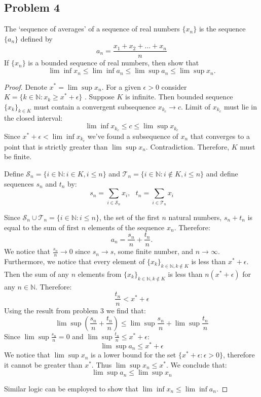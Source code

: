 \documentclass{article}
\begin{document}
\subsection*{Problem 4}

\begin{tcolorbox}
The ‘sequence of averages’ of a sequence of real numbers $\{x_n\}$ is the sequence $\{a_n\}$ defined by
$$ a_n = \frac{x_1+x_2+\dots+x_n}{n} $$
If $\{x_n\}$ is a bounded sequence of real numbers, then show that
$$ \lim \inf x_n \leq \lim \inf a_n \leq \lim \sup a_n \leq \lim \sup x_n. $$
\end{tcolorbox}
\begin{proof}
Denote $x^* = \lim \sup x_n$. For a given $\epsilon>0$ consider $K = \{ k \in \mathbb{N} : x_k \geq x^*+\epsilon \}$ . Suppose $K$ is infinite. Then bounded sequence $\{ x_k \}_{k \in K}$ must contain a convergent subsequence $x_{k_c} \to c$. Limit of $x_{k_c}$ must lie in the closed interval:
$$ \lim \inf x_{k_c} \leq c \leq \lim \sup x_{k_c} $$
Since $x^*+\epsilon < \lim \inf x_{k_c}$ we've found a subsequence of $x_n$ that converges to a point that is strictly greater than $\lim \sup x_n$. Contradiction. Therefore, $K$ must be finite.

Define $\mathcal{S}_n = \{ i \in \mathbb{N} : i \in K, i \leq n \}$ and $\mathcal{T}_n = \{ i \in \mathbb{N} : i \notin K, i \leq n \}$ and define sequences $s_n$ and $t_n$ by:
$$ s_n = \sum_{i \in \mathcal{S}_n}x_i, \>\>\> t_n = \sum_{i \in \mathcal{T}_n}x_i $$

Since $\mathcal{S}_n \cup \mathcal{T}_n = \{ i \in \mathbb{N} : i \leq n \}$, the set of the first $n$ natural numbers, $s_n+t_n$ is equal to the sum of first $n$ elements of the sequence $x_n$. Therefore:
$$ a_n = \frac{s_n}{n}+\frac{t_n}{n}. $$
We notice that $\frac{s_n}{n} \to 0$ since $s_n \to s$, some finite number, and $n \to \infty$. Furthermore, we notice that every element of $\{ x_k \}_{k \in \mathbb{N}, k \notin K}$ is less than $x^* + \epsilon$. Then the sum of any $n$ elements from $\{ x_k \}_{k \in \mathbb{N}, k \notin K}$ is less than $n(x^* + \epsilon)$ for any $n \in \mathbb{N}$. Therefore:
$$ \frac{t_n}{n} < x^* + \epsilon $$
Using the result from problem 3 we find that:
$$ \lim \sup (\frac{s_n}{n}+\frac{t_n}{n}) \leq \lim \sup \frac{s_n}{n} + \lim \sup \frac{t_n}{n} $$
Since $\lim \sup \frac{s_n}{n} = 0$ and $\lim \sup \frac{t_n}{n} \leq x^* + \epsilon$:
$$ \lim \sup a_n \leq x^* + \epsilon $$
We notice that $\lim \sup x_n$ is a lower bound for the set $\{ x^*+\epsilon : \epsilon>0 \}$, therefore it cannot be greater than $x^*$. Thus $\lim \sup x_n \leq x^*$. We conclude that:
$$ \lim \sup a_n \leq \lim \sup x_n $$

Similar logic can be employed to show that $\lim \inf x_n \leq \lim \inf a_n$.

\end{proof}
\end{document}

